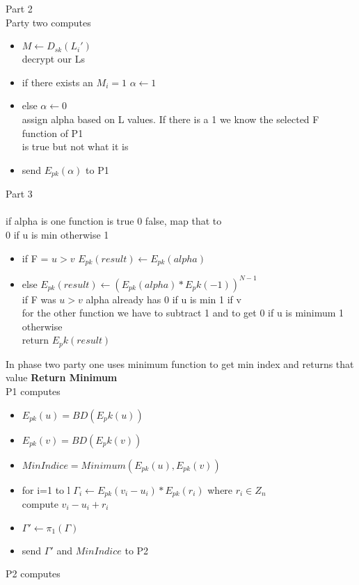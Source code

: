 \documentclass[10pt]{article} %
\begin{document}
Part 2\\
Party two computes
\begin{itemize}
	\item $M \gets D_{sk}(L_i')$
	\\decrypt our Ls
	\item if there exists an $M_i=1$
	\subitem $\alpha \gets 1$
	\item else
	\subitem $\alpha \gets 0$
	\\assign alpha based on L values. If there is a 1 we know the selected F function of P1
	\\is true but not what it is
	\item send $E_{pk}(\alpha)$ to P1
\end{itemize}
Part 3\\
\\if alpha is one function is true 0 false, map that to
\\0 if u is min otherwise 1
\begin{itemize}
	\item if F = $u>v$  
		\subitem $E_{pk}(result) \gets E_{pk}(alpha)$
	\item else	
		\subitem $E_{pk}(result) \gets (E_{pk}(alpha)*E_pk(-1))^{N-1}$
	\\if F was $u>v$ alpha already has 0 if u is min 1 if v
	\\for the other function we have to subtract 1 and to get 0 if u is minimum 1 otherwise
	\\return $E_pk(result)$
\end{itemize}

In phase two party one uses minimum function to get min index and returns that value
\textbf{Return Minimum}\\
P1 computes
\begin{itemize}
	\item $E_{pk}(u)  = BD(E_pk(u))$
	\item $E_{pk}(v)  = BD(E_pk(v))$
	\item $MinIndice = Minimum(E_{pk}(u),E_{pk}(v))$
	\item for i=1 to l
 		\subitem $\Gamma_i \gets E_{pk}(v_i - u_i) * E_{pk}(r_i)$ where $r_i \in Z_n$
 		\\compute $v_i - u_i +r_i$
 	\item  $\Gamma' \gets \pi_1(\Gamma)$
 	\item send $\Gamma'$ and $MinIndice$ to P2
\end{itemize}

P2 computes
\end{document}
